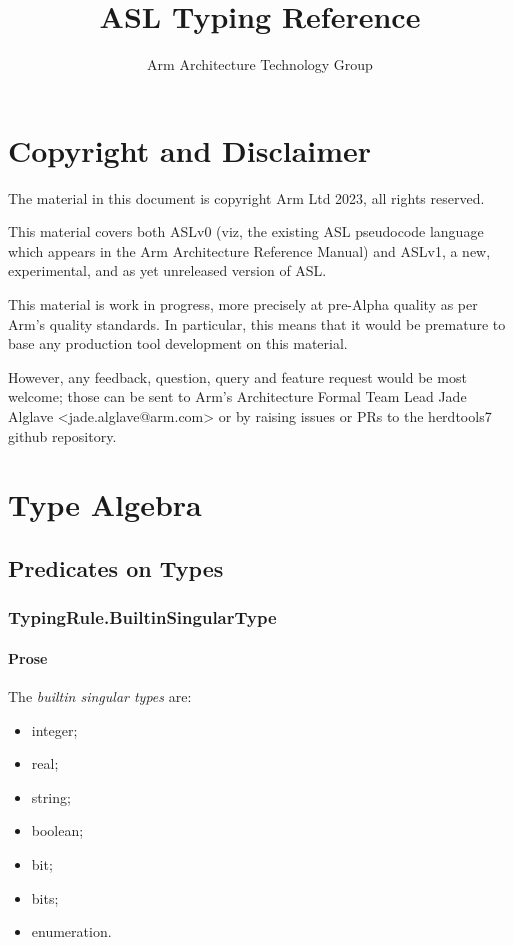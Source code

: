 \documentclass{book}
\author{Arm Architecture Technology Group}
\title{ASL Typing Reference}
\begin{document}
\maketitle
\tableofcontents{}

\chapter{Copyright and Disclaimer}

The material in this document is copyright Arm Ltd 2023, all rights reserved.

This material covers both ASLv0 (viz, the existing ASL pseudocode language
which appears in the Arm Architecture Reference Manual) and ASLv1, a new,
experimental, and as yet unreleased version of ASL.

This material is work in progress, more precisely at pre-Alpha quality as
per Arm’s quality standards. In particular, this means that it would be
premature to base any production tool development on this material.

However, any feedback, question, query and feature request would be most
welcome; those can be sent to Arm’s Architecture Formal Team Lead Jade
Alglave <jade.alglave@arm.com> or by raising issues or PRs to the herdtools7
github repository.

\chapter{Type Algebra}

\section{Predicates on Types}

\subsection{TypingRule.BuiltinSingularType \label{sec:TypingRule.BuiltinSingularType}}

    \subsubsection{Prose}
    The \emph{builtin singular types} are:
    \begin{itemize}
    \item  integer; 
    \item  real;
    \item  string; 
    \item  boolean; 
    \item  bit;
    \item  bits;
    \item  enumeration.
    \end{itemize}
\end{document}

